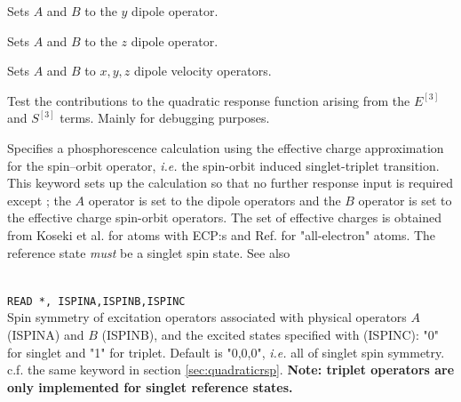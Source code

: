 \begin{description}
\item{}
Sets $A$ and $B$ to the $y$ dipole operator.

\item{}
Sets $A$ and $B$ to the $z$ dipole operator.

\item{}
Sets $A$ and $B$ to $x, y, z$ dipole velocity operators.

\item{}
Test the contributions to the quadratic response function arising from
the $E^{\left[3\right]}$ and $S^{\left[3\right]}$ terms.  Mainly for
debugging purposes.

\item{}
Specifies a phosphorescence calculation using
the effective charge approximation for the spin--orbit operator, {\it i.e.\/}
the spin-orbit
induced singlet-triplet transition. This keyword sets up the
calculation so that no further response input is required except ; the
$A$ operator is set to the dipole operators and
the $B$ operator
is set to the effective charge spin-orbit
operators. The set of effective charges is obtained from Koseki et al.
\cite{skmsgmwsnm99,skmwsmsgjpca102} for atoms with ECP:s and Ref.\cite{skmwsmsgjpc96} for "all-electron" atoms.
The reference state {\em must} be a singlet spin state. See  also 

\item{}\\
\verb|READ *, ISPINA,ISPINB,ISPINC|\\
Spin symmetry of excitation operators associated with physical operators $A$ (ISPINA) and $B$ (ISPINB),
and the excited states specified with  (ISPINC): "0" for singlet and "1" for triplet.
Default is "0,0,0", {\it i.e.\/} all of singlet spin symmetry.
c.f. the same keyword in section \ref{sec:quadraticrsp}.
{\bf Note: triplet operators are only implemented for singlet reference states.}


\end{description}
